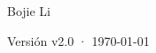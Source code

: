 \begin{titlepage}
\vfill
{\LARGE\sffamily Bojie Li\par}
\vspace{0.7cm}
{\small\sffamily\color{structurecolor!80} Versión v2.0 · \today\par}
\vspace{1.2cm}
\end{titlepage}
